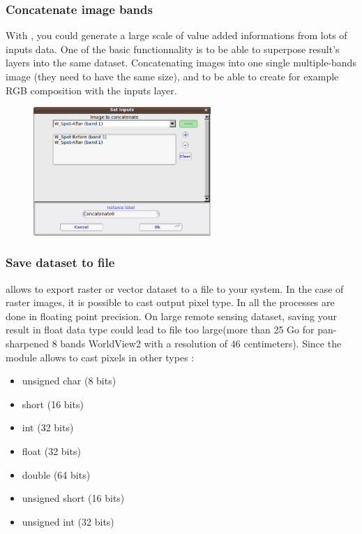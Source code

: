 \subsubsection{Concatenate image bands}
With \mont, you could generate a large scale of value added
informations from lots of inputs data. One of the basic functionnality
is to be able to superpose result's layers into the same dataset.
Concatenating images into one single multiple-bands image (they need
to have the same size), and to be able to create for example RGB
composition with the inputs layer.

\begin{figure}
  \center
  \includegraphics[width=0.6\textwidth]{../Art/MonteverdiImages/monteverdi_concatenate_before_after.png}
  \label{fig:concatenate}
\end{figure}

\subsubsection{Save dataset to file}

\mont allows to export raster or vector dataset to a file to your
system.  In the case of raster images, it is possible to cast output
pixel type. In \mont all the processes are done in floating point
precision.  On large remote sensing dataset, saving your result in
float data type could lead to file too large(more than 25 Go for
pan-sharpened 8 bands WorldView2 with a resolution of $46$
centimeters). Since the module allows to cast pixels in other types :

\begin{itemize}
\item unsigned char (8 bits) 
\item short (16 bits)
\item int (32 bits)
\item float (32 bits)
\item double (64 bits)
\item unsigned short (16 bits)
\item unsigned int (32 bits)
\end{itemize}


